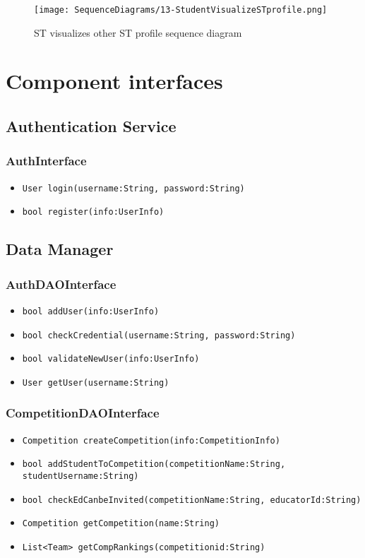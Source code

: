 \begin{figure}[H]
  \centering
  \texttt{[image: SequenceDiagrams/13-StudentVisualizeSTprofile.png]}
  \caption{ST visualizes other ST profile sequence diagram}
  \label{fig:st_visualizes_other_st_profile}
\end{figure}

\section{Component interfaces}
\label{s:component-interfaces}%


\subsection{Authentication Service}
\subsubsection{AuthInterface}
\begin{itemize}
    \item \texttt{User login(username:String, password:String)}%
    \item \texttt{bool register(info:UserInfo)} %
\end{itemize}

\subsection{Data Manager}
\subsubsection{AuthDAOInterface}
\begin{itemize}
    \item \texttt{bool addUser(info:UserInfo)}%
    \item \texttt{bool checkCredential(username:String, password:String)}%
    \item \texttt{bool validateNewUser(info:UserInfo)}%
    \item \texttt{User getUser(username:String)}%
\end{itemize}

\subsubsection{CompetitionDAOInterface}
\begin{itemize}
    \item \texttt{Competition createCompetition(info:CompetitionInfo)}%
    \item \texttt{bool addStudentToCompetition(competitionName:String, studentUsername:String)}
    \item \texttt{bool checkEdCanbeInvited(competitionName:String, educatorId:String)}%
    \item \texttt{Competition getCompetition(name:String)}%
    \item \texttt{List<Team> getCompRankings(competitionid:String)}
\end{itemize}

